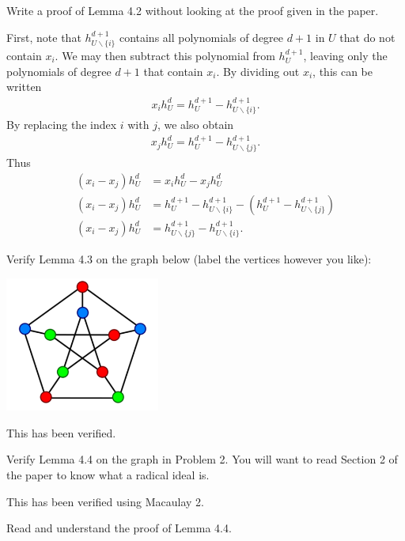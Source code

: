 \documentclass[10pt,letterpaper]{hmcpset}
\newcommand{\aln}[1]{\begin{align*} #1 \end{align*}} %
\begin{document}
\begin{problem}[1]
Write a proof of Lemma 4.2 without looking at the proof given in the paper.
\end{problem}

\begin{solution}
First, note that $h_{U\backslash\{i\}}^{d+1}$ contains all polynomials of degree $d+1$ in $U$ that do not contain $x_i$. We may then subtract this polynomial from $h_U^{d+1}$, leaving only the polynomials of degree $d+1$ that contain $x_i$. By dividing out $x_i$, this can be written
\aln{
	x_i h_U^d = h_U^{d+1} - h_{U\backslash\{i\}}^{d+1}.
}
By replacing the index $i$ with $j$, we also obtain
\aln{
	x_j h_U^d = h_U^{d+1} - h_{U\backslash\{j\}}^{d+1}.
}
Thus
\aln{
	(x_i - x_j) h_U^d &= x_i h_U^d - x_j h_U^d\\
	(x_i - x_j) h_U^d &= h_U^{d+1} - h_{U\backslash\{i\}}^{d+1} - \left(h_U^{d+1} - h_{U\backslash\{j\}}^{d+1} \right)\\
	(x_i - x_j) h_U^d &= h_{U\backslash\{j\}}^{d+1} - h_{U\backslash\{i\}}^{d+1}.
}
\end{solution}


\begin{problem}[2]
Verify Lemma 4.3 on the graph below (label the vertices however you like):
\begin{center}
	\includegraphics[width=2in]{3coloring.png}
\end{center}
\end{problem}

\begin{solution}
This has been verified.
\end{solution}


\begin{problem}[3]
Verify Lemma 4.4 on the graph in Problem 2. You will want to read Section 2 of the paper to know what a radical ideal is.
\end{problem}

\begin{solution}
This has been verified using Macaulay 2.
\end{solution}


\begin{problem}[4]
Read and understand the proof of Lemma 4.4.
\end{problem}
\end{document}
